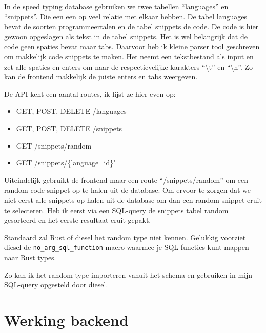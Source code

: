 In de speed typing database gebruiken we twee tabellen “languages” en “snippets”. Die een een op
veel relatie met elkaar hebben. De tabel languages bevat de soorten programmeertalen en de tabel
snippets de code. De code is hier gewoon opgeslagen als tekst in de tabel snippets. Het is wel
belangrijk dat de code geen spaties bevat maar tabs. Daarvoor heb ik kleine parser tool geschreven
om makkelijk code snippets te maken. Het neemt een tekstbestand als input en zet alle spaties en
enters om naar de respectievelijke karakters “\textbackslash t” en “\textbackslash n”. Zo kan de
frontend makkelijk de juiste enters en tabs weergeven. 

De API kent een aantal routes, ik lijst ze hier even op: 
\begin{itemize}
    \item GET, POST, DELETE  /languages
    \item GET, POST, DELETE /snippets 
    \item GET /snippets/random 
    \item GET /snippets/\{language\_id\}"
\end{itemize}

Uiteindelijk gebruikt de frontend maar een route “/snippets/random” om een random code snippet op te
halen uit de database. Om ervoor te zorgen dat we niet eerst alle snippets op halen uit de database
om dan een random snippet eruit te selecteren. Heb ik eerst via een SQL-query de snippets tabel
random gesorteerd en het eerste resultaat eruit gepakt.  

Standaard zal Rust of diesel het random type niet kennen. Gelukkig voorziet diesel de
\texttt{no_arg_sql_function} macro waarmee je SQL functies kunt mappen naar Rust types.

Zo kan ik het random type importeren vanuit het schema en gebruiken in mijn SQL-query opgesteld door diesel.

\section{Werking backend}
